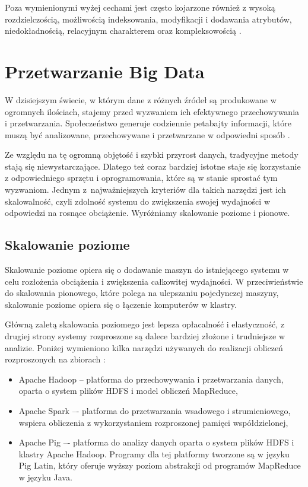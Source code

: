 Poza wymienionymi wyżej cechami  jest często kojarzone również z wysoką rozdzielczością,
możliwością indeksowania, modyfikacji i dodawania atrybutów, niedokładnością, relacyjnym charakterem oraz
kompleksowością \cite{big-data-1}.

\section{Przetwarzanie Big Data}

W dzisiejszym świecie, w którym dane z różnych źródeł są produkowane w ogromnych ilościach,
stajemy przed wyzwaniem ich efektywnego przechowywania i przetwarzania. Społeczeństwo
generuje codziennie petabajty informacji, które muszą być analizowane, przechowywane i
przetwarzane w odpowiedni sposób \cite{big-data-2}.

Ze względu na tę ogromną objętość i szybki przyrost danych, tradycyjne metody stają się
niewystarczające. Dlatego też coraz bardziej istotne staje się korzystanie z odpowiedniego
sprzętu i oprogramowania, które są w stanie sprostać tym wyzwaniom. Jednym z~najważniejszych
kryteriów dla takich narzędzi jest ich skalowalność, czyli zdolność systemu do zwiększenia
swojej wydajności w odpowiedzi na rosnące obciążenie. Wyróżniamy skalowanie poziome i pionowe.

\subsection*{Skalowanie poziome}

Skalowanie poziome opiera się o dodawanie maszyn do istniejącego systemu w celu rozłożenia obciążenia
i zwiększenia całkowitej wydajności. W przeciwieństwie do skalowania pionowego, które polega na
ulepszaniu pojedynczej maszyny, skalowanie poziome opiera się o łączenie komputerów w klastry.

Główną zaletą skalowania poziomego jest lepsza opłacalność i elastyczność, z drugiej strony systemy
rozproszone są dalece bardziej złożone i trudniejsze w analizie.
Poniżej wymieniono kilka narzędzi używanych do realizacji obliczeń rozproszonych na zbiorach
 \cite{big-data-3}:
\begin{itemize}
      \item Apache Hadoop -- platforma do przechowywania i przetwarzania danych,\newline
            oparta o system plików HDFS i model obliczeń MapReduce,
      \item Apache Spark –- platforma do przetwarzania wsadowego i strumieniowego,\newline
            wspiera obliczenia z wykorzystaniem rozproszonej pamięci współdzielonej,
      \item Apache Pig –- platforma do analizy danych oparta o system plików HDFS i klastry Apache Hadoop.
            Programy dla tej platformy tworzone są w języku Pig Latin, który oferuje wyższy poziom abstrakcji
            od programów MapReduce w języku Java.
\end{itemize}

